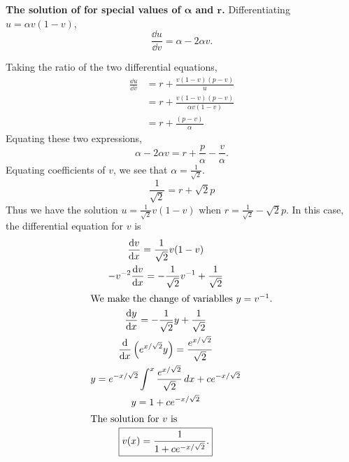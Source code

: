 \begin{Solution}
  \textbf{The solution of for special values of $\boldsymbol{\alpha}$ 
  and $\mathbf{r}$.}
  Differentiating $u = \alpha v (1-v)$,
  \[ \frac{\dd u}{\dd v} = \alpha - 2 \alpha v. \]

  Taking the ratio of the two differential equations,
  \begin{align*}
    \frac{\dd u}{\dd v}   
    &= r + \frac{v(1-v)(p-v)}{u} \\
    &= r + \frac{v(1-v)(p-v)}{\alpha v (1-v)} \\
    &= r + \frac{(p-v)}{\alpha}
  \end{align*}
  Equating these two expressions,
  \[ \alpha - 2 \alpha v = r + \frac{p}{\alpha} - \frac{v}{\alpha}. \]
  Equating coefficients of $v$, we see that $\alpha = \frac{1}{\sqrt{2}}$.
  \[\frac{1}{\sqrt{2}} = r + \sqrt{2} p \]
  Thus we have the solution $u = \frac{1}{\sqrt{2}} v (1-v)$ when 
  $r = \frac{1}{\sqrt{2}} - \sqrt{2} p$.
  In this case, the differential equation for $v$ is
  \begin{gather*}
    \frac{\mathrm{d} v}{\mathrm{d} x} = \frac{1}{\sqrt{2}} v (1-v) \\
    -v^{-2} \frac{\mathrm{d} v}{\mathrm{d} x} = - \frac{1}{\sqrt{2}} v^{-1} + \frac{1}{\sqrt{2}} \\
    \intertext{We make the change of variablles $y = v^{-1}$.}
    \frac{\mathrm{d} y}{\mathrm{d} x} = -\frac{1}{\sqrt{2}} y + \frac{1}{\sqrt{2}} \\
    \frac{\mathrm{d}}{\mathrm{d} x} \left( e^{x / \sqrt{2}} y \right) 
    = \frac{e^{x / \sqrt{2}}}{\sqrt{2}} \\
    y = e^{-x / \sqrt{2}} \int^x \frac{e^{x / \sqrt{2}}}{\sqrt{2}} \,d x 
    + c e^{-x / \sqrt{2}} \\
    y = 1 + c e^{-x / \sqrt{2}} \\
    \intertext{The solution for $v$ is}
    \boxed{ v(x) = \frac{1}{1 + c e^{-x / \sqrt{2}}}. }
  \end{gather*}
\end{Solution}



